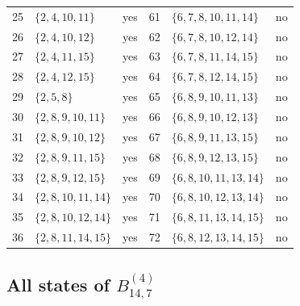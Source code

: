 \documentclass[aps,pra,reprint,superscriptaddress,longbibliography,nofootinbib,floatfix,10pt]{revtex4-2}
\theoremstyle{definition}
\begin{document}
\begin{longtable}{rlc@{\qquad}rlc}
25 & $\{2,\allowbreak 4,\allowbreak 10,\allowbreak 11\}$ & yes & 61 & $\{6,\allowbreak 7,\allowbreak 8,\allowbreak 10,\allowbreak 11,\allowbreak 14\}$ & no\\
26 & $\{2,\allowbreak 4,\allowbreak 10,\allowbreak 12\}$ & yes & 62 & $\{6,\allowbreak 7,\allowbreak 8,\allowbreak 10,\allowbreak 12,\allowbreak 14\}$ & no\\
27 & $\{2,\allowbreak 4,\allowbreak 11,\allowbreak 15\}$ & yes & 63 & $\{6,\allowbreak 7,\allowbreak 8,\allowbreak 11,\allowbreak 14,\allowbreak 15\}$ & no\\
28 & $\{2,\allowbreak 4,\allowbreak 12,\allowbreak 15\}$ & yes & 64 & $\{6,\allowbreak 7,\allowbreak 8,\allowbreak 12,\allowbreak 14,\allowbreak 15\}$ & no\\
29 & $\{2,\allowbreak 5,\allowbreak 8\}$ & yes & 65 & $\{6,\allowbreak 8,\allowbreak 9,\allowbreak 10,\allowbreak 11,\allowbreak 13\}$ & no\\
30 & $\{2,\allowbreak 8,\allowbreak 9,\allowbreak 10,\allowbreak 11\}$ & yes & 66 & $\{6,\allowbreak 8,\allowbreak 9,\allowbreak 10,\allowbreak 12,\allowbreak 13\}$ & no\\
31 & $\{2,\allowbreak 8,\allowbreak 9,\allowbreak 10,\allowbreak 12\}$ & yes & 67 & $\{6,\allowbreak 8,\allowbreak 9,\allowbreak 11,\allowbreak 13,\allowbreak 15\}$ & no\\
32 & $\{2,\allowbreak 8,\allowbreak 9,\allowbreak 11,\allowbreak 15\}$ & yes & 68 & $\{6,\allowbreak 8,\allowbreak 9,\allowbreak 12,\allowbreak 13,\allowbreak 15\}$ & no\\
33 & $\{2,\allowbreak 8,\allowbreak 9,\allowbreak 12,\allowbreak 15\}$ & yes & 69 & $\{6,\allowbreak 8,\allowbreak 10,\allowbreak 11,\allowbreak 13,\allowbreak 14\}$ & no\\
34 & $\{2,\allowbreak 8,\allowbreak 10,\allowbreak 11,\allowbreak 14\}$ & yes & 70 & $\{6,\allowbreak 8,\allowbreak 10,\allowbreak 12,\allowbreak 13,\allowbreak 14\}$ & no\\
35 & $\{2,\allowbreak 8,\allowbreak 10,\allowbreak 12,\allowbreak 14\}$ & yes & 71 & $\{6,\allowbreak 8,\allowbreak 11,\allowbreak 13,\allowbreak 14,\allowbreak 15\}$ & no\\
36 & $\{2,\allowbreak 8,\allowbreak 11,\allowbreak 14,\allowbreak 15\}$ & yes & 72 & $\{6,\allowbreak 8,\allowbreak 12,\allowbreak 13,\allowbreak 14,\allowbreak 15\}$ & no\\
\end{longtable}\endgroup
{}\subsection{All states of \texorpdfstring{$B_{14,7}^{(4)}$}{gadget 4c}}
\end{document}
